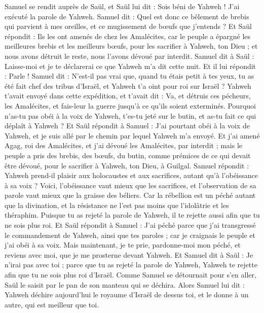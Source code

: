 \begin{multicols}{2}
Samuel se rendit auprès de Saül, et Saül lui dit : Sois béni de Yahweh ! J’ai exécuté la parole de Yahweh.
Samuel dit : Quel est donc ce bêlement de brebis qui parvient à mes oreilles, et ce mugissement de bœufs que j'entends ?
Et Saül répondit : Ils les ont amenés de chez les Amalécites, car le peuple a épargné les meilleures brebis et les meilleurs bœufs, pour les sacrifier à Yahweh, ton Dieu ; et nous avons détruit le reste, nous l’avons dévoué par interdit.
Samuel dit à Saül : Laisse-moi et je te déclarerai ce que Yahweh m'a dit cette nuit. Et il lui répondit : Parle !
Samuel dit : N'est-il pas vrai que, quand tu étais petit à tes yeux, tu as été fait chef des tribus d'Israël, et Yahweh t'a oint pour roi sur Israël ?
Yahweh t'avait envoyé dans cette expédition, et t'avait dit : Va, et détruis ces pécheurs, les Amalécites, et fais-leur la guerre jusqu'à ce qu'ils soient exterminés.
Pourquoi n'as-tu pas obéi à la voix de Yahweh, t'es-tu jeté sur le butin, et as-tu fait ce qui déplaît à Yahweh ?
Et Saül répondit à Samuel : J'ai pourtant obéi à la voix de Yahweh, et je suis allé par le chemin par lequel Yahweh m'a envoyé. Et j'ai amené Agag, roi des Amalécites, et j'ai dévoué les Amalécites, par interdit ;
mais le peuple a pris des brebis, des bœufs, du butin, comme prémices de ce qui devait être dévoué, pour le sacrifier à Yahweh, ton Dieu, à Guilgal.
Samuel répondit : Yahweh prend-il plaisir aux holocaustes et aux sacrifices, autant qu’à l’obéissance à sa voix ? Voici, l'obéissance vaut mieux que les sacrifices, et l’observation de sa parole vaut mieux que la graisse des béliers.
Car la rébellion est un péché autant que la divination, et la résistance ne l’est pas moins que l’idolâtrie et les théraphim. Puisque tu as rejeté la parole de Yahweh, il te rejette aussi afin que tu ne sois plus roi.
Et Saül répondit à Samuel : J'ai péché parce que j'ai transgressé le commandement de Yahweh, ainsi que tes paroles ; car je craignais le peuple et j'ai obéi à sa voix.
Mais maintenant, je te prie, pardonne-moi mon péché, et reviens avec moi, que je me prosterne devant Yahweh.
Et Samuel dit à Saül : Je n’irai pas avec toi ; parce que tu as rejeté la parole de Yahweh, Yahweh te rejette afin que tu ne sois plus roi d’Israël.
Comme Samuel se détournait pour s'en aller, Saül le saisit par le pan de son manteau qui se déchira.
Alors Samuel lui dit : Yahweh déchire aujourd'hui le royaume d'Israël de dessus toi, et le donne à un autre, qui est meilleur que toi.

\end{multicols}
